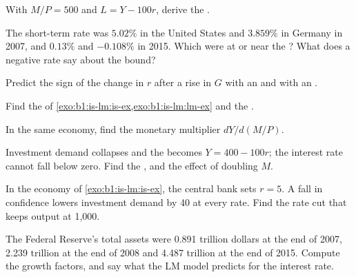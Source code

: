 \begin{exercise}[$\star$]\label{exo:b1:is-lm:lm-ex}
With $M/P = 500$ and $L = Y - 100r$, derive the .
\end{exercise}

\begin{exercise}[$\star$]\label{exo:b1:is-lm:read}
The short-term rate was $5.02\%$ in the United States and $3.859\%$ in Germany in
2007, and $0.13\%$ and $-0.108\%$ in 2015. %
Which were at or near the ? What does a negative rate say
about the bound?
\end{exercise}

\begin{exercise}[$\star$]\label{exo:b1:is-lm:sign}
Predict the sign of the change in $r$ after a rise in $G$ with an  and
with an .
\end{exercise}

\begin{exercise}[$\star\star$]\label{exo:b1:is-lm:eq}
Find the  of \cref{exo:b1:is-lm:is-ex,exo:b1:is-lm:lm-ex} and the .
\end{exercise}

\begin{exercise}[$\star\star$]\label{exo:b1:is-lm:monetary}
In the same economy, find the monetary multiplier $dY/d(M/P)$.
\end{exercise}

\begin{exercise}[$\star\star$]\label{exo:b1:is-lm:trap-ex}
Investment demand collapses and the  becomes $Y = 400 - 100r$; the
interest rate cannot fall below zero. Find the , and the effect
of doubling $M$.
\end{exercise}

\begin{exercise}[$\star\star$]\label{exo:b1:is-lm:mp-ex}
In the economy of \cref{exo:b1:is-lm:is-ex}, the central bank sets $r = 5$. A fall
in confidence lowers investment demand by 40 at every rate. Find the rate
cut that keeps output at 1,000.
\end{exercise}

\begin{exercise}[$\star\star$]\label{exo:b1:is-lm:assets}
The Federal Reserve's total assets were 0.891 trillion dollars at the end of
2007, 2.239 trillion at the end of 2008 and 4.487 trillion at the end of
2015. %
Compute the growth factors, and say what the LM model predicts for the
interest rate.
\end{exercise}

